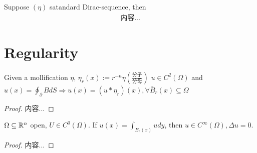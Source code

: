 \documentclass[Total.tex]{subfiles}
\begin{document}
			\begin{lemma}
				Suppose $(\eta)$ satandard Dirac-sequence, then
				\begin{gather*}
					内容...
				\end{gather*}
			\end{lemma}
		\section{Regularity}
			\begin{lemma}
				Given a mollification $\eta$, $\eta_r(x):=r^{-n}\eta(\frac{分子}{分母})$ $u\in C^2(\Omega)$ and $u(x)=\oint_\partial BdS\Rightarrow u(x)=(u*\eta_r)(x),\forall \bar{B}_r(x)\subseteq \Omega$
			\end{lemma}
			\begin{proof}
				内容...
			\end{proof}
			\begin{proposition}
				$\Omega\subseteq \mathbb{R}^n$ open, $U\in C^0(\Omega)$. If $u(x)=\int_{B_r(x)} udy$, then $u\in C^\infty(\Omega),\Delta u=0$.			
			\end{proposition}
			\begin{proof}
				内容...
			\end{proof}
\end{document}
